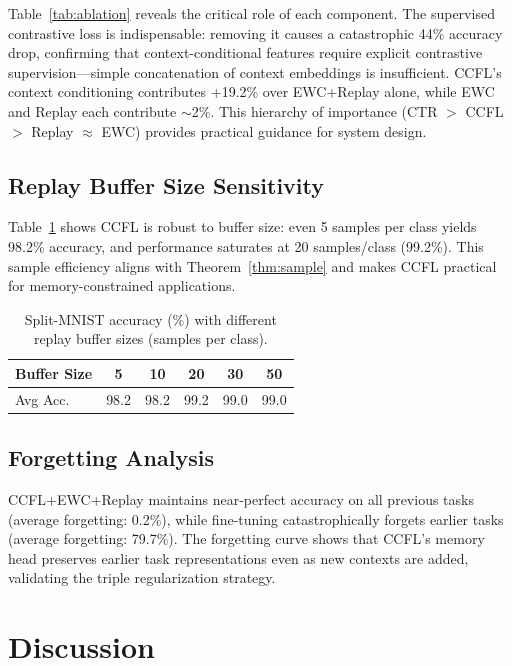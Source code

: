 \documentclass[letterpaper, 10pt, times]{article}
\begin{document}
Table~\ref{tab:ablation} reveals the critical role of each component. The supervised contrastive loss is indispensable: removing it causes a catastrophic 44\% accuracy drop, confirming that context-conditional features require explicit contrastive supervision---simple concatenation of context embeddings is insufficient. CCFL's context conditioning contributes +19.2\% over EWC+Replay alone, while EWC and Replay each contribute $\sim$2\%. This hierarchy of importance (CTR $>$ CCFL $>$ Replay $\approx$ EWC) provides practical guidance for system design.

\subsection{Replay Buffer Size Sensitivity}

Table~\ref{tab:buffer} shows CCFL is robust to buffer size: even 5 samples per class yields 98.2\% accuracy, and performance saturates at 20 samples/class (99.2\%). This sample efficiency aligns with Theorem~\ref{thm:sample} and makes CCFL practical for memory-constrained applications.

\begin{table}[t]
\centering
\caption{Split-MNIST accuracy (\%) with different replay buffer sizes (samples per class).}
\label{tab:buffer}
\begin{tabular}{lccccc}
\toprule
Buffer Size & 5 & 10 & 20 & 30 & 50 \\
\midrule
Avg Acc. & 98.2 & 98.2 & 99.2 & 99.0 & 99.0 \\
\bottomrule
\end{tabular}
\end{table}

\subsection{Forgetting Analysis}

CCFL+EWC+Replay maintains near-perfect accuracy on all previous tasks (average forgetting: 0.2\%), while fine-tuning catastrophically forgets earlier tasks (average forgetting: 79.7\%). The forgetting curve shows that CCFL's memory head preserves earlier task representations even as new contexts are added, validating the triple regularization strategy.

\section{Discussion}
\end{document}
